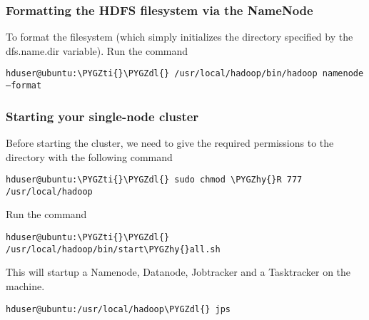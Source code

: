 \documentclass[letterpaper,10pt,english]{sphinxmanual}
\def\PYGZdl{\char`\$}
\def\PYGZhy{\char`\-}
\def\PYGZti{\char`\~}
\begin{document}
\subsubsection{Formatting the HDFS filesystem via the NameNode}
\label{hadoop:formatting-the-hdfs-filesystem-via-the-namenode}
To format the filesystem (which simply initializes the directory specified by the dfs.name.dir variable).
Run the command

\begin{Verbatim}[commandchars=\\\{\}]
hduser@ubuntu:\PYGZti{}\PYGZdl{} /usr/local/hadoop/bin/hadoop namenode –format
\end{Verbatim}


\subsubsection{Starting your single-node cluster}
\label{hadoop:starting-your-single-node-cluster}
Before starting the cluster, we need to give the required permissions to the directory with the following command

\begin{Verbatim}[commandchars=\\\{\}]
hduser@ubuntu:\PYGZti{}\PYGZdl{} sudo chmod \PYGZhy{}R 777 /usr/local/hadoop
\end{Verbatim}

Run the command

\begin{Verbatim}[commandchars=\\\{\}]
hduser@ubuntu:\PYGZti{}\PYGZdl{} /usr/local/hadoop/bin/start\PYGZhy{}all.sh
\end{Verbatim}

This will startup a Namenode, Datanode, Jobtracker and a Tasktracker on the machine.

\begin{Verbatim}[commandchars=\\\{\}]
hduser@ubuntu:/usr/local/hadoop\PYGZdl{} jps
\end{Verbatim}
\end{document}
